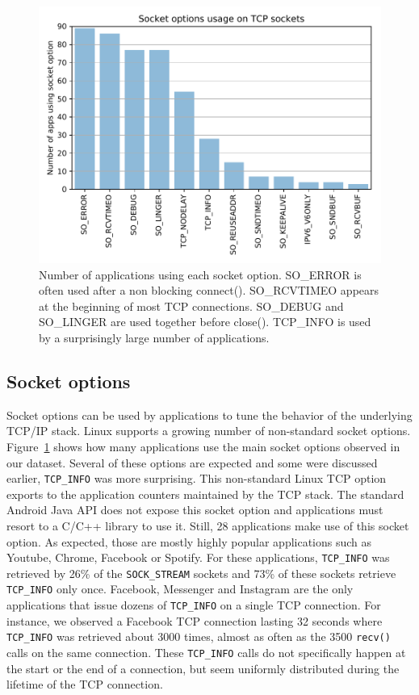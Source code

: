 \begin{figure}
\centering
\includegraphics[width=\columnwidth]{figures/sockopts_bars}
\caption{Number of applications using each socket option.
    SO\_ERROR is often used after a non blocking
connect(). SO\_RCVTIMEO appears at the beginning of most TCP connections.
SO\_DEBUG and SO\_LINGER are used together before close(). TCP\_INFO
is used by a surprisingly large number of applications.}
\label{fig:sockopts_bars}
\end{figure}

\subsection{Socket options}

Socket options can be used by applications to tune the behavior of
the underlying TCP/IP stack. Linux supports a growing number of
non-standard socket options. Figure~\ref{fig:sockopts_bars} shows how many
applications use the main socket options observed in our dataset.
Several of these options are expected and some were discussed earlier,
\texttt{TCP\_INFO} was more surprising. This non-standard Linux TCP option
exports to the application counters maintained by the TCP stack. The standard
Android Java API does not expose this socket option and applications must
resort to a C/C++ library to use it. Still, 28 applications make use
of this socket option. As expected, those are mostly highly popular
applications such as Youtube, Chrome, Facebook or Spotify. For these
applications, \texttt{TCP\_INFO} was retrieved by 26\% of the
\texttt{SOCK\_STREAM} sockets and 73\% of these sockets retrieve
\texttt{TCP\_INFO} only once. Facebook, Messenger and Instagram are the
only applications that issue dozens of \texttt{TCP\_INFO} on a 
single TCP connection. For instance, we observed a Facebook TCP
connection lasting 32 seconds where \texttt{TCP\_INFO} was retrieved about
3000 times, almost as often as the 3500 \texttt{recv()} calls on the same
connection. These \texttt{TCP\_INFO} calls do not specifically happen at the
start or the end of a connection, but seem uniformly distributed during the
lifetime of the TCP connection.
